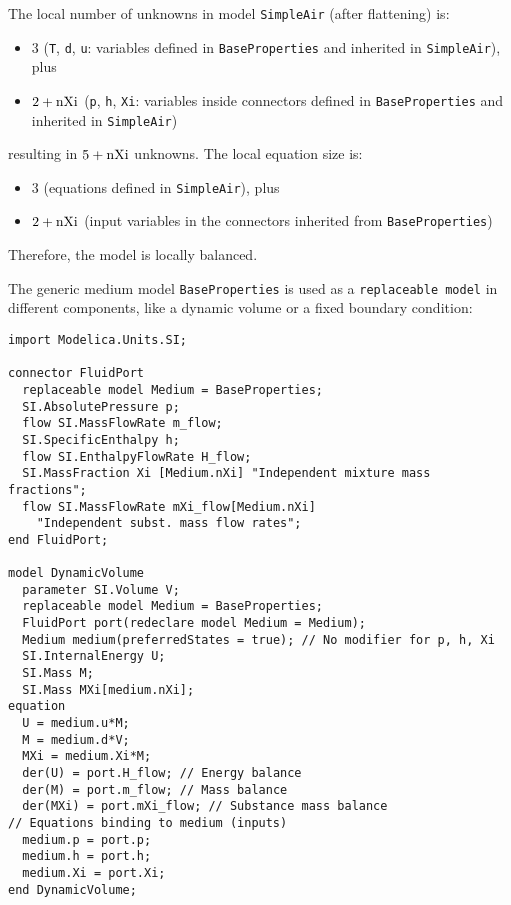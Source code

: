 \begin{example}
The local number of unknowns in model \lstinline!SimpleAir! (after flattening) is:
\begin{itemize}
\item
  $3$ (\lstinline!T!, \lstinline!d!, \lstinline!u!: variables defined in
  \lstinline!BaseProperties! and inherited in \lstinline!SimpleAir!), plus
\item
  $2 + \text{\lstinline!nXi!}$ (\lstinline!p!, \lstinline!h!, \lstinline!Xi!: variables inside connectors defined in \lstinline!BaseProperties! and inherited in \lstinline!SimpleAir!)
\end{itemize}
resulting in $5 + \text{\lstinline!nXi!}$ unknowns.
The local equation size is:
\begin{itemize}
\item
  $3$ (equations defined in \lstinline!SimpleAir!), plus
\item
  $2 + \text{\lstinline!nXi!}$ (input variables in the connectors inherited from \lstinline!BaseProperties!)
\end{itemize}

Therefore, the model is locally balanced.

The generic medium model \lstinline!BaseProperties! is used as a \lstinline!replaceable model! in different components, like a dynamic volume or a fixed boundary condition:
\begin{lstlisting}[language=modelica]
import Modelica.Units.SI;

connector FluidPort
  replaceable model Medium = BaseProperties;
  SI.AbsolutePressure p;
  flow SI.MassFlowRate m_flow;
  SI.SpecificEnthalpy h;
  flow SI.EnthalpyFlowRate H_flow;
  SI.MassFraction Xi [Medium.nXi] "Independent mixture mass fractions";
  flow SI.MassFlowRate mXi_flow[Medium.nXi]
    "Independent subst. mass flow rates";
end FluidPort;

model DynamicVolume
  parameter SI.Volume V;
  replaceable model Medium = BaseProperties;
  FluidPort port(redeclare model Medium = Medium);
  Medium medium(preferredStates = true); // No modifier for p, h, Xi
  SI.InternalEnergy U;
  SI.Mass M;
  SI.Mass MXi[medium.nXi];
equation
  U = medium.u*M;
  M = medium.d*V;
  MXi = medium.Xi*M;
  der(U) = port.H_flow; // Energy balance
  der(M) = port.m_flow; // Mass balance
  der(MXi) = port.mXi_flow; // Substance mass balance
// Equations binding to medium (inputs)
  medium.p = port.p;
  medium.h = port.h;
  medium.Xi = port.Xi;
end DynamicVolume;
\end{lstlisting}


\end{example}
